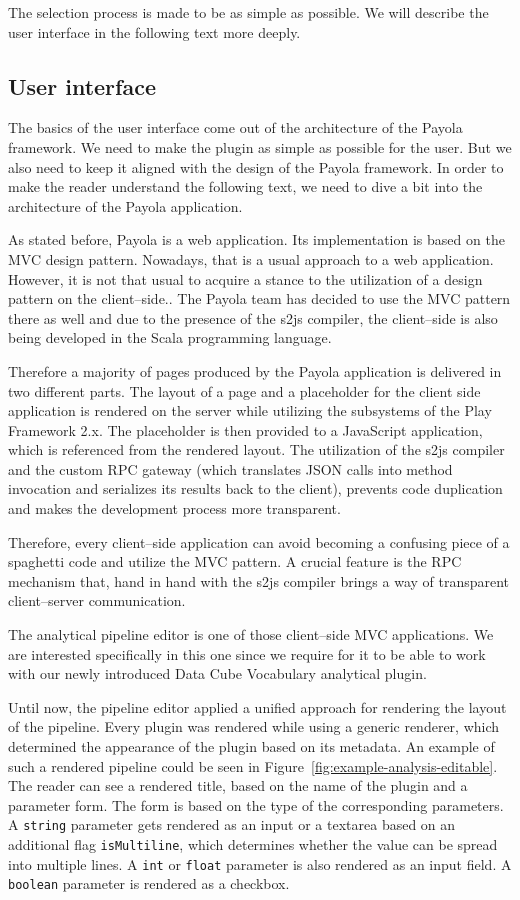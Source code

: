 The selection process is made to be as simple as possible. We will describe the 
user interface in the following text more deeply.

\subsection{User interface}
The basics of the user interface come out of the architecture of the Payola 
framework. We need to make the plugin as simple as possible for the user. But we 
also need to keep it aligned with the design of the Payola framework. In order to 
make the reader understand the following text, we need to dive a bit into the 
architecture of the Payola application.

As stated before, Payola is a web application. Its implementation is based on the MVC 
design pattern. Nowadays, that is a usual approach to a web application. However, it is not that usual 
to acquire a stance to the utilization of a design pattern on the client--side.. The 
Payola team has decided to use the MVC pattern there as well and due to 
the presence of the s2js compiler, the client--side is also being developed in 
the Scala programming language.

Therefore a majority of pages produced by the Payola application is delivered 
in two different parts. The layout of a page and a placeholder for the client 
side application is rendered on the server while utilizing the subsystems of the 
Play Framework 2.x. The placeholder is then provided to a JavaScript application,
which is referenced from the rendered layout. The utilization of the s2js compiler and
the custom RPC gateway (which translates JSON calls into method invocation and serializes its results
back to the client), prevents code duplication and makes the development process more transparent.

Therefore, every client--side application can avoid becoming a confusing piece of a
spaghetti code and utilize the MVC pattern. A crucial feature is the RPC 
mechanism that, hand in hand with the s2js compiler brings a way of transparent 
client--server communication.

The analytical pipeline editor is one of those client--side MVC applications. We 
are interested specifically in this one since we require for it to be able to work 
with our newly introduced Data Cube Vocabulary analytical plugin.

Until now, the pipeline editor applied a unified approach for rendering the 
layout of the pipeline. Every plugin was rendered while using a generic 
renderer, which determined the appearance of the plugin based on its metadata. An 
example of such a rendered pipeline could be seen in
Figure~\ref{fig:example-analysis-editable}. The reader can see a rendered title, based on 
the name of the plugin and a parameter form. The form is based on the type of the 
corresponding parameters. A \texttt{string} parameter gets rendered as an input or a textarea based on
an additional flag \texttt{isMultiline}, which determines whether the value can be spread into multiple lines.
A \texttt{int} or \texttt{float} parameter is also rendered as an input field. A \texttt{boolean} parameter 
is rendered as a checkbox.

